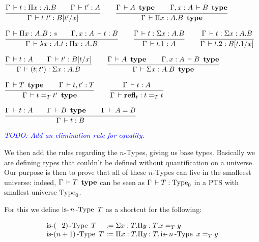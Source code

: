 \documentclass[a4paper,english]{lipics-utf8x}
\newcommand\meta[1]{\noindent\textcolor{blue}{\emph{#1}}}
\begin{document}
  \begin{center}
  \(
    \ru{\Gamma \der t : \Pi x:A.B \qquad
        \Gamma \der t' : A
      }{\Gamma \der t\ t' : B[t'/x]}
    \qquad
    \ru{\Gamma \der A \type \qquad
        \Gamma, x:A \der B \type
      }{\Gamma \der \Pi x:A.B \type}
  \)
  \end{center}

  \begin{center}
  \(
    \ru{\Gamma \der \Pi x:A.B : s \qquad
        \Gamma, x:A \der t : B
      }{\Gamma \der \lambda x:A.t : \Pi x:A.B}
    \qquad
    \ru{\Gamma \der t : \Sigma x:A.B
      }{\Gamma \der t.1 : A}
    \qquad
    \ru{\Gamma \der t : \Sigma x:A.B
      }{\Gamma \der t.2 : B[t.1/x]}
  \)
  \end{center}

  \begin{center}
  \(
    \ru{\Gamma \der t : A \qquad
        \Gamma \der t' : B[t/x]
      }{\Gamma \der (t ; t') : \Sigma x:A.B}
    \qquad
    \ru{\Gamma \der A \type \qquad
        \Gamma, x:A \der B \type
      }{\Gamma \der \Sigma x:A.B \type}
  \)
  \end{center}

  \begin{center}
  \(
    \ru{\Gamma \der T \type \qquad
        \Gamma \der t,t' : T
      }{\Gamma \der t =_T t' \type}
    \qquad
    \ru{\Gamma \der t : A
      }{\Gamma \der \refl_t : t =_T t}
  \)
  \end{center}

  \begin{center}
  \(
    \ru{\Gamma \der t : A \qquad
        \Gamma \der B \type \qquad
        \Gamma \der A = B
      }{\Gamma \der t : B}
  \)
  \end{center}

  \meta{TODO: Add an elimination rule for equality.}

  \noindent %
  We then add the rules regarding the $n$-Types, giving us base
  types.
  Basically we are defining types that couldn't be defined without
  quantification on a universe. Our purpose is then to prove
  that all of these $n$-Types can live in the smalleest universe:
  indeed, $\Gamma \,\vdash T \operatorname{\ \mathbf{type}}$ can be seen as
  $\Gamma \,\vdash T : \operatorname{Type}_0$ in a PTS with smallest universe
  $\operatorname{Type}_0$.

  For this we define $\operatorname{is-}n\operatorname{-Type}\ T$ as a shortcut for the following:

  \[
  \begin{array}{l@{~}l}
    \isnType{(-2)}{T}  & := \Sigma x:T. \Pi y:T. x =_T y \\
    \isnType{(n+1)}{T} & := \Pi x:T. \Pi y:T. \isnType{n}{x =_T y}
  \end{array}
  \]
\end{document}
